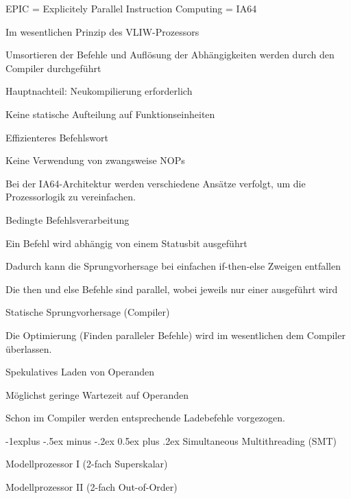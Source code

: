 \documentclass[10pt,landscape]{article}
\makeatletter
\renewcommand{\subsection}{\@startsection{subsection}{2}{0mm}%
                                {-1explus -.5ex minus -.2ex}%
                                {0.5ex plus .2ex}%
                                {\normalfont\normalsize\bfseries}}
\makeatother
\begin{document}
\begin{multicols}{3}
  EPIC = Explicitely Parallel Instruction Computing = IA64
  \begin{itemize*}
    \item Im wesentlichen Prinzip des VLIW-Prozessors
    \item Umsortieren der Befehle und Auflösung der Abhängigkeiten werden durch den Compiler durchgeführt
    \item Hauptnachteil: Neukompilierung erforderlich
    \item Keine statische Aufteilung auf Funktionseinheiten
    \item Effizienteres Befehlswort
    \item Keine Verwendung von zwangsweise NOPs
  \end{itemize*}
  
  Bei der IA64-Architektur werden verschiedene Ansätze verfolgt, um die Prozessorlogik zu vereinfachen.
  \begin{enumerate*}
    \item Bedingte Befehlsverarbeitung
    \begin{itemize*}
      \item Ein Befehl wird abhängig von einem Statusbit ausgeführt
      \item Dadurch kann die Sprungvorhersage bei einfachen if-then-else Zweigen entfallen
      \item Die then und else Befehle sind parallel, wobei jeweils nur einer ausgeführt wird
    \end{itemize*}
    \item Statische Sprungvorhersage (Compiler)
    \item Die Optimierung (Finden paralleler Befehle) wird im wesentlichen dem Compiler überlassen.
    \item Spekulatives Laden von Operanden
    \begin{itemize*}
      \item Möglichst geringe Wartezeit auf Operanden
      \item Schon im Compiler werden entsprechende Ladebefehle vorgezogen.
    \end{itemize*}
  \end{enumerate*}
  
  
  \subsection{Simultaneous Multithreading (SMT)}
  \begin{itemize*}
    \item Modellprozessor I (2-fach Superskalar)
    \item Modellprozessor II (2-fach Out-of-Order)
  \end{itemize*}
  

\end{multicols}
\end{document}
